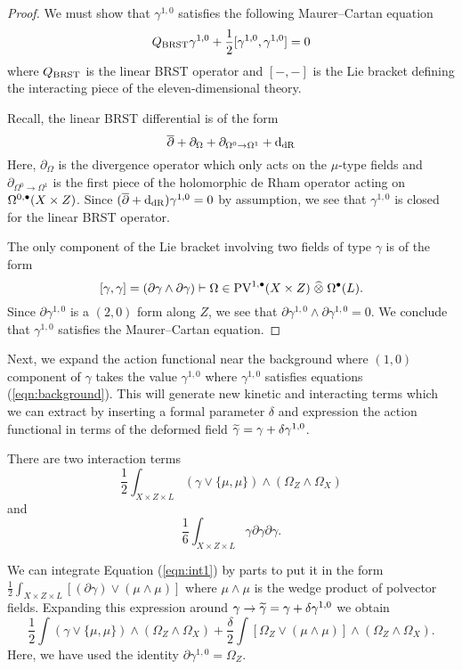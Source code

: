 \documentclass[11pt]{amsart}
\def\PV{{\rm PV}}
\begin{document}
\begin{proof}
  We must show that $\gamma^{1,0}$ satisfies the following Maurer--Cartan equation
  \[
    Q_{\rm BRST} \gamma^{1,0} + \frac12 [\gamma^{1,0} ,\gamma^{1,0}] = 0
  \]
  where $Q_{\rm BRST}$ is the linear BRST operator and $[-,-]$ is the Lie bracket defining the interacting piece of the eleven-dimensional theory.

  Recall, the linear BRST differential is of the form
  \[
    \dbar + \partial_{\Omega} + \partial_{\Omega^0 \to \Omega^1} + \d_{\rm dR}
  \]
  Here, $\partial_\Omega$ is the divergence operator which only acts on the $\mu$-type fields and $\partial_{\Omega^0 \to \Omega^1}$ is the first piece of the holomorphic de Rham operator acting on $\Omega^{0,\bu}(X \times Z)$.
  Since $(\dbar + \d_{\rm dR}) \gamma^{1,0} = 0$ by assumption, we see that $\gamma^{1,0}$ is closed for the linear BRST operator.

  The only component of the Lie bracket involving two fields of type $\gamma$ is of the form
  \[
    [\gamma, \gamma] = (\partial \gamma \wedge \partial \gamma) \vdash \Omega \in \PV^{1,\bu}(X \times Z) \; \Hat{\otimes} \; \Omega^\bu(L) .
  \]
  Since $\partial \gamma^{1,0}$ is a $(2,0)$ form along $Z$, we see that $\partial \gamma^{1,0} \wedge \partial \gamma^{1,0} =0$.
  We conclude that $\gamma^{1,0}$ satisfies the Maurer--Cartan equation.
\end{proof}

Next, we expand the action functional near the background where $(1,0)$ component of $\gamma$ takes the value $\gamma^{1,0}$ where $\gamma^{1,0}$ satisfies equations (\ref{eqn:background}).
This will generate new kinetic and interacting terms which we can extract by inserting a formal parameter $\delta$ and expression the action functional in terms of the deformed field $\Tilde{\gamma} = \gamma + \delta \gamma^{1,0}$.

There are two interaction terms
\begin{equation}\label{eqn:int1}
  \frac12 \int_{X\times Z \times L} \left(\gamma \vee \{\mu, \mu\} \right) \wedge (\Omega_Z \wedge \Omega_X)
\end{equation}
and
\begin{equation} \label{eqn:int2}
  \frac16\int_{X \times Z \times L} \gamma \partial \gamma \partial \gamma .
\end{equation}

We can integrate Equation (\ref{eqn:int1}) by parts to put it in the form $\frac12 \int_{X \times Z \times L} \left[(\partial \gamma) \vee (\mu \wedge \mu) \right]$ where $\mu \wedge \mu$ is the wedge product of polvector fields.
Expanding this expression around $\gamma \to \Tilde{\gamma} = \gamma + \delta \gamma^{1,0}$ we obtain
\[
  \frac12 \int \left(\gamma \vee \{\mu, \mu\} \right) \wedge (\Omega_Z \wedge \Omega_X) + \frac{\delta}{2} \int \left[\Omega_Z \vee (\mu \wedge \mu) \right] \wedge (\Omega_Z \wedge \Omega_X) .
\]
Here, we have used the identity $\partial \gamma^{1,0} = \Omega_Z$.
\end{document}
